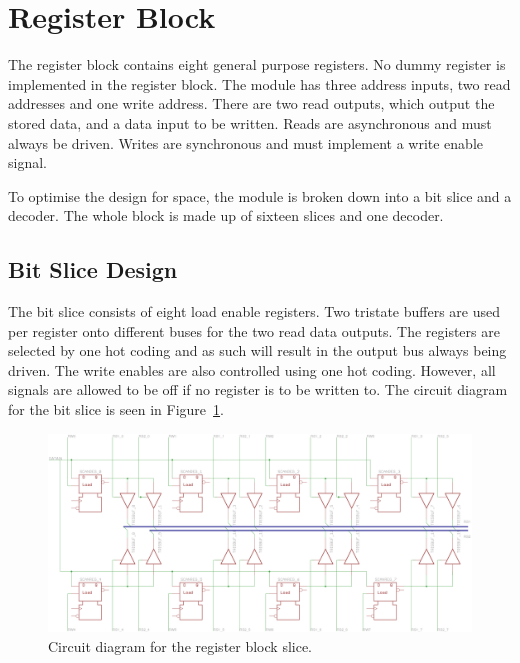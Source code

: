 
\section{Register Block}

The register block contains eight general purpose registers. 
No dummy register is implemented in the register block. 
The module has three address inputs, two read addresses and one write address. 
There are two read outputs, which output the stored data, and a data input to be written. 
Reads are asynchronous and must always be driven. 
Writes are synchronous and must implement a write enable signal. 

To optimise the design for space, the module is broken down into a bit slice and a decoder. 
The whole block is made up of sixteen slices and one decoder. 

\subsection{Bit Slice Design}

The bit slice consists of eight load enable registers. 
Two tristate buffers are used per register onto different buses for the two read data outputs. 
The registers are selected by one hot coding and as such will result in the output bus always being driven. 
The write enables are also controlled using one hot coding. 
However, all signals are allowed to be off if no register is to be written to.
The circuit diagram for the bit slice is seen in Figure~\ref{fig:reg:slice}.

\begin{figure}
\centering
\includegraphics[angle=90,height=\textheight]{../../eagle/regBlock/regBlock_slice.png}
\caption{Circuit diagram for the register block slice.}
\label{fig:reg:slice}
\end{figure}



